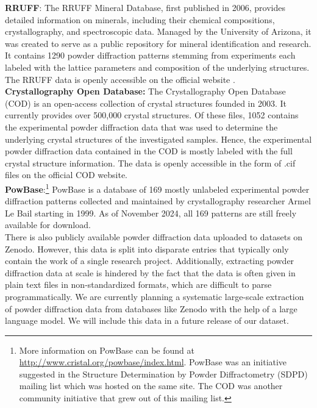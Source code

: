 \textbf{RRUFF}: \cite{RRUFFWeb} The RRUFF Mineral Database, first published in 2006, provides detailed information on minerals, including their chemical compositions, crystallography, and spectroscopic data. \cite{lafuente2015} Managed by the University of Arizona, it was created to serve as a public repository for mineral identification and research. It contains \num{1290} powder diffraction patterns stemming from experiments each labeled with the lattice parameters and composition of the underlying structures. The RRUFF data is openly accessible on the official website \cite{RRUFFWeb}. \\

\textbf{Crystallography Open Database:} \cite{CODWeb} The Crystallography Open Database (COD) is an open-access collection of crystal structures founded in 2003\cite{Graulis2009cod}. It currently provides over 500,000 crystal structures. Of these files, 1052 contains the experimental powder diffraction data that was used to determine the underlying crystal structures of the investigated samples. Hence, the experimental powder diffraction data contained in the COD is mostly labeled with the full crystal structure information. The data is openly accessible in the form of .cif files on the official COD website\cite{CODWeb}. \\

\textbf{PowBase}:\footnote{More information on PowBase can be found at \url{http://www.cristal.org/powbase/index.html}. PowBase was an initiative suggested in the Structure Determination by Powder Diffractometry (SDPD) mailing list which was hosted on the same site. The COD was another community initiative that grew out of this mailing list.} PowBase is a database of 169 mostly unlabeled experimental powder diffraction patterns collected and maintained by crystallography researcher Armel Le Bail starting in 1999. As of November 2024, all 169 patterns are still freely available for download. \\

There is also publicly available powder diffraction data uploaded to datasets on Zenodo. However, this data is split into disparate entries that typically only contain the work of a single research project. Additionally, extracting powder diffraction data at scale is hindered by the fact that the data is often given in plain text files in non-standardized formats, which are difficult to parse programmatically. We are currently planning a systematic large-scale extraction of powder diffraction data from databases like Zenodo with the help of a large language model. We will include this data in a future release of our dataset.\\

